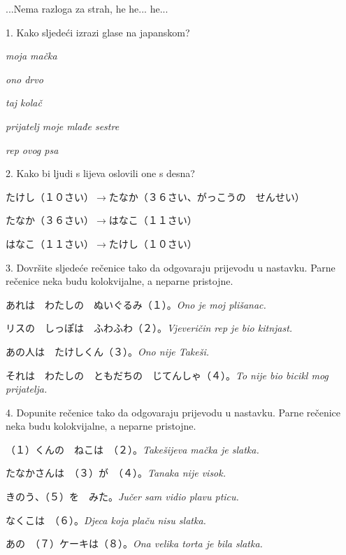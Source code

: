 
\author{Marko Miličić, Tomislav Mamić}

	
	...Nema razloga za strah, he he... he...
	
	\begin{mondai}{1. Kako sljedeći izrazi glase na japanskom?}
		\item \textit{moja mačka}
		\item \textit{ono drvo}
		\item \textit{taj kolač}
		\item \textit{prijatelj moje mlađe sestre}
		\item \textit{rep ovog psa}
	\end{mondai}

	\begin{mondai}{2. Kako bi ljudi s lijeva oslovili one s desna?}
		\item たけし（１０さい）$\rightarrow$たなか（３６さい、がっこうの　せんせい）
		\item たなか（３６さい）$\rightarrow$はなこ（１１さい）
		\item はなこ（１１さい）$\rightarrow$たけし（１０さい）
		
	\end{mondai}

	\begin{mondai}{3. Dovršite sljedeće rečenice tako da odgovaraju prijevodu u nastavku. Parne rečenice neka budu kolokvijalne, a neparne pristojne.}
		\item あれは　わたしの　ぬいぐるみ（１）。\textit{Ono je moj plišanac.}
		\item リスの　しっぽは　ふわふわ（２）。\textit{Vjeveričin rep je bio kitnjast.}
		\item あの人は　たけしくん（３）。\textit{Ono nije Takeši.}
		\item それは　わたしの　ともだちの　じてんしゃ（４）。\textit{To nije bio bicikl mog prijatelja.}
	\end{mondai}

	\begin{mondai}{4. Dopunite rečenice tako da odgovaraju prijevodu u nastavku. Parne rečenice neka budu kolokvijalne, a neparne pristojne.}
		\item （１）くんの　ねこは　（２）。\textit{Takešijeva mačka je slatka.}
		\item たなかさんは　（３）が　（４）。\textit{Tanaka nije visok.}
		\item きのう、（５）を　みた。\textit{Jučer sam vidio plavu pticu.}
		\item なくこは　（６）。\textit{Djeca koja plaču nisu slatka.}
		\item あの　（７）ケーキは（８）。\textit{Ona velika torta je bila slatka.}
	\end{mondai}

